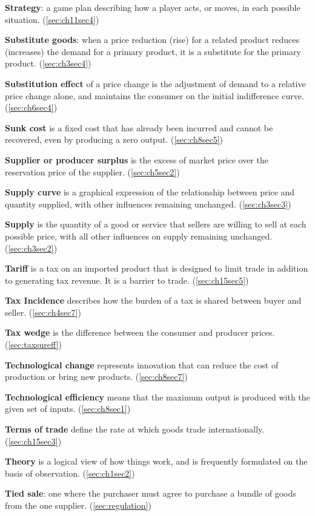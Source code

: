 \textbf{Strategy}: a game plan describing how a player acts, or moves, in each possible situation. (\ref{sec:ch11sec4})

\textbf{Substitute goods}: when a price reduction (rise) for a related product reduces (increases) the demand for a primary product, it is a substitute for the primary product. (\ref{sec:ch3sec4})

\textbf{Substitution effect} of a price change is the adjustment of demand to a relative price change alone, and maintains the consumer on the initial indifference curve. (\ref{sec:ch6sec4})

\textbf{Sunk cost} is a fixed cost that has already been incurred and cannot be recovered, even by producing a zero output. (\ref{sec:ch8sec5})

\textbf{Supplier or producer surplus} is the excess of market price over the reservation price of the supplier. (\ref{sec:ch5sec2})

\textbf{Supply curve} is a graphical expression of the relationship between price and quantity supplied, with other influences remaining unchanged. (\ref{sec:ch3sec3})

\textbf{Supply} is the quantity of a good or service that sellers are willing to sell at each possible price, with all other influences on supply remaining unchanged. (\ref{sec:ch3sec2})

\textbf{Tariff} is a tax on an imported product that is designed to limit trade in addition to generating tax revenue. It is a barrier to trade. (\ref{sec:ch15sec5})

\textbf{Tax Incidence} describes how the burden of a tax is shared between buyer and seller. (\ref{sec:ch4sec7})

\textbf{Tax wedge} is the difference between the consumer and producer prices. (\ref{sec:taxsureff})

\textbf{Technological change} represents innovation that can reduce the cost of production or bring new products. (\ref{sec:ch8sec7})

\textbf{Technological efficiency} means that the maximum output is produced with the given set of inputs. (\ref{sec:ch8sec1})

\textbf{Terms of trade} define the rate at which goods trade internationally. (\ref{sec:ch15sec3})

\textbf{Theory} is a logical view of how things work, and is frequently formulated on the basis of observation. (\ref{sec:ch1sec2})

\textbf{Tied sale}: one where the purchaser must agree to purchase a bundle of goods from the one supplier. (\ref{sec:regulation})

